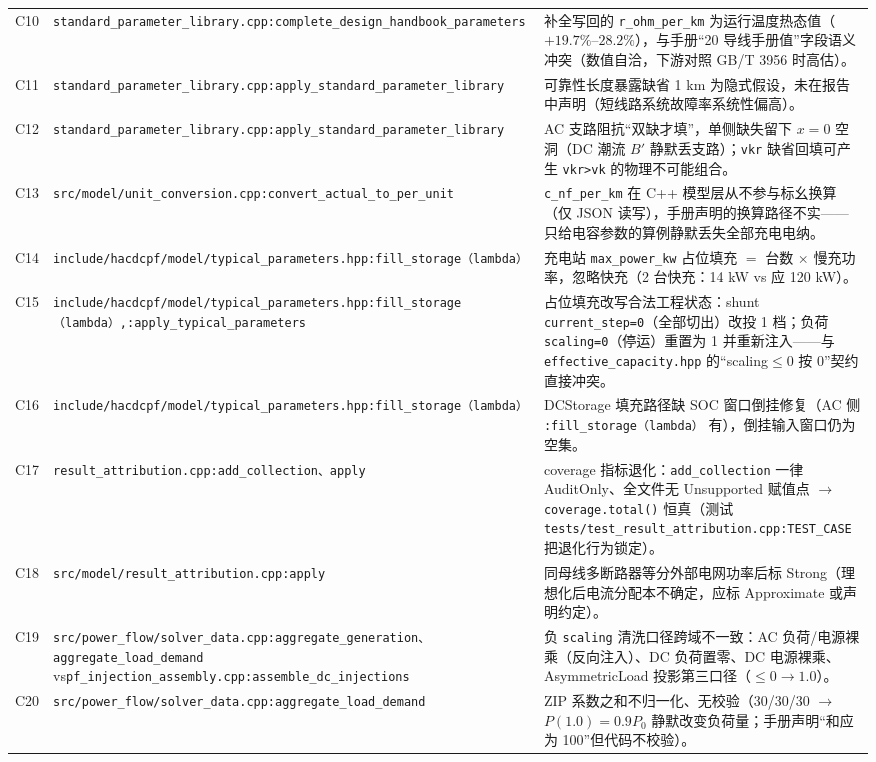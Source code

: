 \documentclass[11pt,a4paper,fontset=fandol]{ctexart}
\newcommand{\file}[1]{\texttt{#1}}
\begin{document}
\begin{footnotesize}
\begin{longtable}{@{}p{0.7cm}p{5.2cm}p{9.3cm}@{}}
C10 & \file{standard\_parameter\_library.cpp:complete\_design\_handbook\_parameters} & 补全写回的 \texttt{r\_ohm\_per\_km} 为运行温度热态值（$+19.7\%$--$28.2\%$），与手册``20 \textcelsius{} 导线手册值''字段语义冲突（数值自洽，下游对照 GB/T 3956 时高估）。\\
C11 & \file{standard\_parameter\_library.cpp:apply\_standard\_parameter\_library} & 可靠性长度暴露缺省 1 km 为隐式假设，未在报告中声明（短线路系统故障率系统性偏高）。\\
C12 & \file{standard\_parameter\_library.cpp:apply\_standard\_parameter\_library} & AC 支路阻抗``双缺才填''，单侧缺失留下 $x=0$ 空洞（DC 潮流 $B'$ 静默丢支路）；\texttt{vkr} 缺省回填可产生 \texttt{vkr>vk} 的物理不可能组合。\\
C13 & \file{src/model/unit\_conversion.cpp:convert\_actual\_to\_per\_unit} & \texttt{c\_nf\_per\_km} 在 C++ 模型层从不参与标幺换算（仅 JSON 读写），手册声明的换算路径不实——只给电容参数的算例静默丢失全部充电电纳。\\
C14 & \file{include/hacdcpf/model/typical\_parameters.hpp:fill\_storage（lambda）} & 充电站 \texttt{max\_power\_kw} 占位填充 $=$ 台数 $\times$ 慢充功率，忽略快充（2 台快充：14 kW vs 应 120 kW）。\\
C15 & \file{include/hacdcpf/model/typical\_parameters.hpp:fill\_storage（lambda）,}\newline\file{:apply\_typical\_parameters} & 占位填充改写合法工程状态：shunt \texttt{current\_step=0}（全部切出）改投 1 档；负荷 \texttt{scaling=0}（停运）重置为 1 并重新注入——与 \file{effective\_capacity.hpp} 的``scaling$\le$0 按 0''契约直接冲突。\\
C16 & \file{include/hacdcpf/model/typical\_parameters.hpp:fill\_storage（lambda）} & DCStorage 填充路径缺 SOC 窗口倒挂修复（AC 侧 \file{:fill\_storage（lambda）} 有），倒挂输入窗口仍为空集。\\
C17 & \file{result\_attribution.cpp:add\_collection、apply} & coverage 指标退化：\texttt{add\_collection} 一律 AuditOnly、全文件无 Unsupported 赋值点 $\to$ \texttt{coverage.total()} 恒真（测试 \file{tests/test\_result\_attribution.cpp:TEST\_CASE} 把退化行为锁定）。\\
C18 & \file{src/model/result\_attribution.cpp:apply} & 同母线多断路器等分外部电网功率后标 Strong（理想化后电流分配本不确定，应标 Approximate 或声明约定）。\\
C19 & \file{src/power\_flow/solver\_data.cpp:aggregate\_generation、aggregate\_load\_demand} vs\newline\file{pf\_injection\_assembly.cpp:assemble\_dc\_injections} & 负 \texttt{scaling} 清洗口径跨域不一致：AC 负荷/电源裸乘（反向注入）、DC 负荷置零、DC 电源裸乘、AsymmetricLoad 投影第三口径（$\le 0 \to 1.0$）。\\
C20 & \file{src/power\_flow/solver\_data.cpp:aggregate\_load\_demand} & ZIP 系数之和不归一化、无校验（30/30/30 $\to$ $P(1.0)=0.9P_0$ 静默改变负荷量；手册声明``和应为 100''但代码不校验）。\\
\bottomrule
\end{longtable}
\end{footnotesize}
\end{document}
